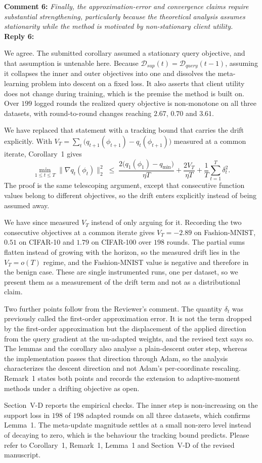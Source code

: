 \documentclass[10pt]{article}
\begin{document}
\noindent
\textbf{Comment 6:} \textit{Finally, the approximation-error and convergence claims require substantial strengthening, particularly because the theoretical analysis assumes stationarity while the method is motivated by non-stationary client utility.}\\
\noindent
\textbf{Reply 6:} {We agree. The submitted corollary assumed a stationary query objective, and that assumption is untenable here. Because $\mathcal{D}_{sup}(t)=\mathcal{D}_{query}(t-1)$, assuming it collapses the inner and outer objectives into one and dissolves the meta-learning problem into descent on a fixed loss. It also asserts that client utility does not change during training, which is the premise the method is built on. Over $199$ logged rounds the realized query objective is non-monotone on all three datasets, with round-to-round changes reaching $2.67$, $0.70$ and $3.61$.

We have replaced that statement with a tracking bound that carries the drift explicitly. With $V_T=\sum_t\bigl(q_{t+1}(\phi_{t+1})-q_t(\phi_{t+1})\bigr)$ measured at a common iterate, Corollary~1 gives
\[
\min_{1\le t\le T}\lVert\nabla q_t(\phi_t)\rVert_2^2\;\le\;\frac{2\bigl(q_1(\phi_1)-q_{\min}\bigr)}{\eta T}+\frac{2V_T}{\eta T}+\frac{1}{T}\sum_{t=1}^{T}\delta_t^2 .
\]
The proof is the same telescoping argument, except that consecutive function values belong to different objectives, so the drift enters explicitly instead of being assumed away.

We have since measured $V_T$ instead of only arguing for it. Recording the two consecutive objectives at a common iterate gives $V_T=-2.89$ on Fashion-MNIST, $0.51$ on CIFAR-10 and $1.79$ on CIFAR-100 over $198$ rounds. The partial sums flatten instead of growing with the horizon, so the measured drift lies in the $V_T=o(T)$ regime, and the Fashion-MNIST value is negative and therefore in the benign case. These are single instrumented runs, one per dataset, so we present them as a measurement of the drift term and not as a distributional claim.

Two further points follow from the Reviewer's comment. The quantity $\delta_t$ was previously called the first-order approximation error. It is not the term dropped by the first-order approximation but the displacement of the applied direction from the query gradient at the un-adapted weights, and the revised text says so. The lemmas and the corollary also analyse a plain-descent outer step, whereas the implementation passes that direction through Adam, so the analysis characterizes the descent direction and not Adam's per-coordinate rescaling. Remark~1 states both points and records the extension to adaptive-moment methods under a drifting objective as open.

Section~V-D reports the empirical checks. The inner step is non-increasing on the support loss in $198$ of $198$ adapted rounds on all three datasets, which confirms Lemma~1. The meta-update magnitude settles at a small non-zero level instead of decaying to zero, which is the behaviour the tracking bound predicts. Please refer to Corollary~1, Remark~1, Lemma~1 and Section~V-D of the revised manuscript.}\\
\end{document}
